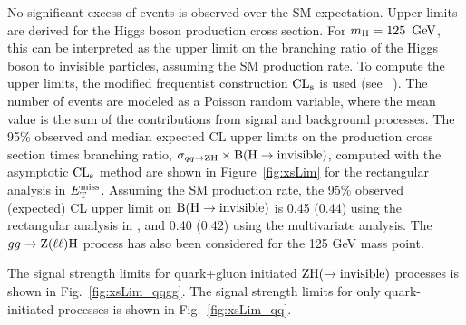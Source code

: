 No significant excess of events is observed over the SM expectation.
Upper limits are derived for the Higgs boson production cross section.
For  $m_{\mathrm{H}} = 125~\,\text{Ge\hspace{-.08em}V}$, this can be interpreted as the upper limit on the
branching ratio of the Higgs boson to invisible particles,
assuming the SM production rate. 
To compute the upper limits, the modified frequentist construction 
$\text{CL}_\text{s}$ is used (see ~\cite{Read1,junkcls,ATLAS:2011tau}).
The number of events are modeled as a Poisson random variable, 
where the mean value is the sum of the contributions from signal and background processes. 
The 95\% observed and median expected CL upper limits on the production cross section times branching ratio, 
$\sigma_{qq \to \mathrm{Z} \mathrm{H}} \times \mathrm{B}(\mathrm{H} \to {\rm invisible})$, computed with the asymptotic $\text{CL}_\text{s}$
method are shown in Figure~\ref{fig:xsLim} for the rectangular analysis in $E_\mathrm{T}^{\mathrm{miss}}$.
Assuming the SM production rate, the 95\% observed (expected) CL upper limit on $\mathrm{B}(\mathrm{H} \to {\rm invisible})$ is
0.45 (0.44) using the rectangular analysis in \met, and 0.40 (0.42) using the multivariate analysis. 
The $gg \to \mathrm{Z}(\ell\ell)\mathrm{H}$ process has also been considered for the 125 GeV mass point. 

The signal strength limits for quark+gluon initiated $\mathrm{Z}\mathrm{H}(\to{\rm invisible})$ processes is shown in Fig.~\ref{fig:xsLim_qqgg}.
The signal strength limits for only quark-initiated processes is shown in Fig.~\ref{fig:xsLim_qq}.



